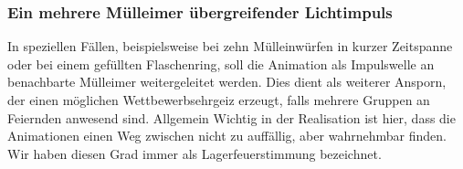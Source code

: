     \subsubsection{Ein mehrere Mülleimer übergreifender Lichtimpuls}

        In speziellen Fällen, beispielsweise bei zehn Mülleinwürfen in kurzer Zeitspanne oder bei einem gefüllten Flaschenring, soll die Animation als Impulswelle an benachbarte Mülleimer weitergeleitet werden.
        Dies dient als weiterer Ansporn, der einen möglichen Wettbewerbsehrgeiz erzeugt, falls mehrere Gruppen an Feiernden anwesend sind.
        Allgemein Wichtig in der Realisation ist hier, dass die Animationen einen Weg zwischen nicht zu auffällig, aber wahrnehmbar finden.
        Wir haben diesen Grad immer als Lagerfeuerstimmung bezeichnet.
